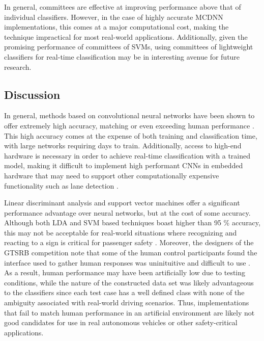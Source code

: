 \documentclass[letterpaper,twocolumn,10pt]{article}
\begin{document}
In general, committees are effective at improving performance above that of individual classifiers. However, in the case of highly accurate MCDNN implementations, this comes at a major computational cost, making the technique impractical for most real-world applications. Additionally, given the promising performance of committees of SVMs, using committees of lightweight classifiers for real-time classification may be in interesting avenue for future research.

\subsection{Discussion}

In general, methods based on convolutional neural networks have been shown to offer extremely high accuracy, matching or even exceeding human performance \cite{ciresan_committee_2011, ciresan_multi-column_2012, sermanet_convolutional_2012, sermanet_traffic_2011}. This high accuracy comes at the expense of both training and classification time, with large networks requiring days to train. Additionally, access to high-end hardware is necessary in order to achieve real-time classification with a trained model, making it difficult to implement high performant CNNs in embedded hardware that may need to support other computationally expensive functionality such as lane detection \cite{ciresan_committee_2011, ciresan_multi-column_2012, lane-detection}.

Linear discriminant analysis and support vector machines offer a significant performance advantage over neural networks, but at the cost of some accuracy. Although both LDA and SVM based techniques boast higher than 95 \% accuracy, this may not be acceptable for real-world situations where recognizing and reacting to a sign is critical for passenger safety \cite{}. Moreover, the designers of the GTSRB competition note that some of the human control participants found the interface used to gather human responses was uninituitive and difficult to use \cite{stallkamp_german_2011, stallkamp_man_2012}. As a result, human performance may have been artificially low due to testing conditions, while the nature of the constructed data set was likely advantageous to the classifiers since each test case has a well defined class with none of the ambiguity associated with real-world driving scenarios. Thus, implementations that fail to match human performance in an artificial environment are likely not good candidates for use in real autonomous vehicles or other safety-critical applications.
\end{document}
